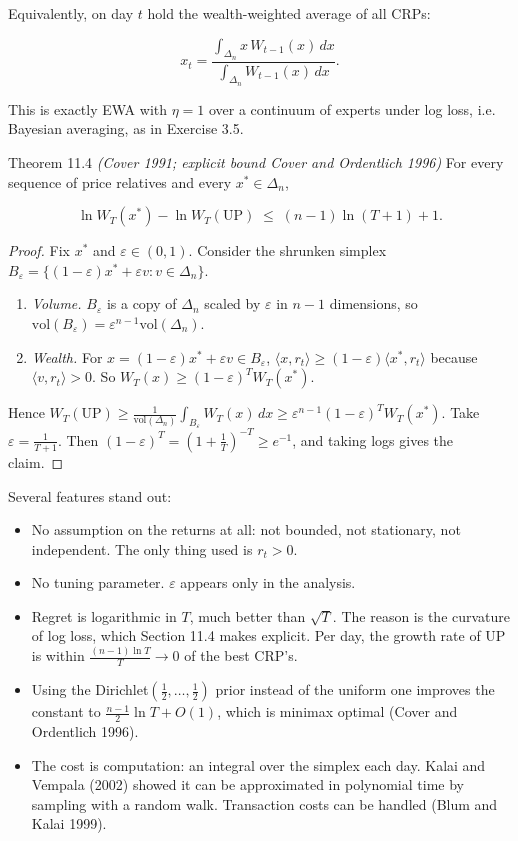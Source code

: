 \documentclass[11pt,a4paper,openany]{book}
\newcommand{\eps}{\varepsilon}
\newcommand{\ip}[2]{\langle #1,#2\rangle}
\newcommand{\simplex}{\Delta}
\begin{document}
Equivalently, on day $t$ hold the wealth-weighted average of all CRPs:

\[x_t=\frac{\int_{\simplex_n}x\,W_{t-1}(x)\,dx}{\int_{\simplex_n}W_{t-1}(x)\,dx}.\]

This is exactly EWA with $\eta=1$ over a continuum of experts under log loss, i.e. Bayesian averaging, as in Exercise 3.5.

\begin{bthm}{Theorem 11.4 \emph{(Cover 1991; explicit bound Cover and Ordentlich 1996)}}
For every sequence of price relatives and every $x^*\in\simplex_n$,

\[\ln W_T(x^*)-\ln W_T(\mathrm{UP})\;\le\;(n-1)\ln(T+1)+1.\]

\end{bthm}

\begin{proof}
Fix $x^*$ and $\eps\in(0,1)$. Consider the shrunken simplex $B_\eps=\{(1-\eps)x^*+\eps v:v\in\simplex_n\}$.

\begin{enumerate}
\item \emph{Volume.} $B_\eps$ is a copy of $\simplex_n$ scaled by $\eps$ in $n-1$ dimensions, so $\mathrm{vol}(B_\eps)=\eps^{n-1}\mathrm{vol}(\simplex_n)$.
\item \emph{Wealth.} For $x=(1-\eps)x^*+\eps v\in B_\eps$, $\ip{x}{r_t}\ge(1-\eps)\ip{x^*}{r_t}$ because $\ip{v}{r_t}>0$. So $W_T(x)\ge(1-\eps)^TW_T(x^*)$.
\end{enumerate}

Hence $W_T(\mathrm{UP})\ge\frac{1}{\mathrm{vol}(\simplex_n)}\int_{B_\eps}W_T(x)\,dx\ge\eps^{n-1}(1-\eps)^TW_T(x^*)$. Take $\eps=\frac1{T+1}$. Then $(1-\eps)^T=(1+\frac1T)^{-T}\ge e^{-1}$, and taking logs gives the claim.
\end{proof}

Several features stand out:

\begin{itemize}
\item No assumption on the returns at all: not bounded, not stationary, not independent. The only thing used is $r_t>0$.
\item No tuning parameter. $\eps$ appears only in the analysis.
\item Regret is logarithmic in $T$, much better than $\sqrt T$. The reason is the curvature of log loss, which Section 11.4 makes explicit. Per day, the growth rate of UP is within $\frac{(n-1)\ln T}{T}\to0$ of the best CRP's.
\item Using the Dirichlet$(\tfrac12,\dots,\tfrac12)$ prior instead of the uniform one improves the constant to $\frac{n-1}2\ln T+O(1)$, which is minimax optimal (Cover and Ordentlich 1996).
\item The cost is computation: an integral over the simplex each day. Kalai and Vempala (2002) showed it can be approximated in polynomial time by sampling with a random walk. Transaction costs can be handled (Blum and Kalai 1999).
\end{itemize}
\end{document}
